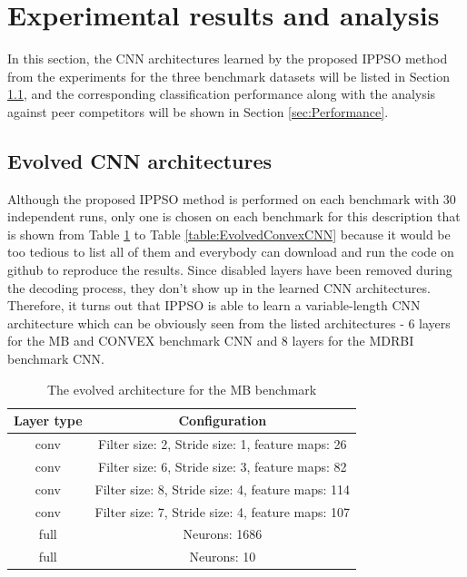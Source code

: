 \documentclass[conference]{IEEEtran}
\begin{document}
\section{Experimental results and analysis}\label{sec:EPResults}

In this section, the CNN architectures learned by the proposed IPPSO method from the experiments for the three benchmark datasets will be listed in Section \ref{sec:EvolvedCNN}, and the corresponding classification performance along with the analysis against peer competitors will be shown in Section \ref{sec:Performance}. 

\subsection{Evolved CNN architectures}\label{sec:EvolvedCNN}

Although the proposed IPPSO method is performed on each benchmark with 30 independent runs, only one is chosen on each benchmark for this description that is shown from Table \ref{table:EvolvedMBCNN} to Table \ref{table:EvolvedConvexCNN} because it would be too tedious to list all of them and everybody can download and run the code on github to reproduce the results. Since disabled layers have been removed during the decoding process, they don't show up in the learned CNN architectures. Therefore, it turns out that IPPSO is able to learn a variable-length CNN architecture which can be obviously seen from the listed architectures - 6 layers for the MB and CONVEX benchmark CNN and 8 layers for the MDRBI benchmark CNN. 

\begin{table}[!t]
	\renewcommand{\arraystretch}{1.3}
	\caption{The evolved architecture for the MB benchmark}
	\label{table:EvolvedMBCNN}
	\centering
	\begin{tabular}{|c|c|}
		\hline
		Layer type & Configuration\\
		\hline
		conv & Filter size: 2, Stride size: 1, feature maps: 26\\
		\hline
		conv & Filter size: 6, Stride size: 3, feature maps: 82\\
		\hline
		conv & Filter size: 8, Stride size: 4, feature maps: 114\\
		\hline
		conv & Filter size: 7, Stride size: 4, feature maps: 107\\
		\hline
		full & Neurons: 1686\\
		\hline
		full & Neurons: 10\\
		\hline
	\end{tabular}
\end{table}
\end{document}
